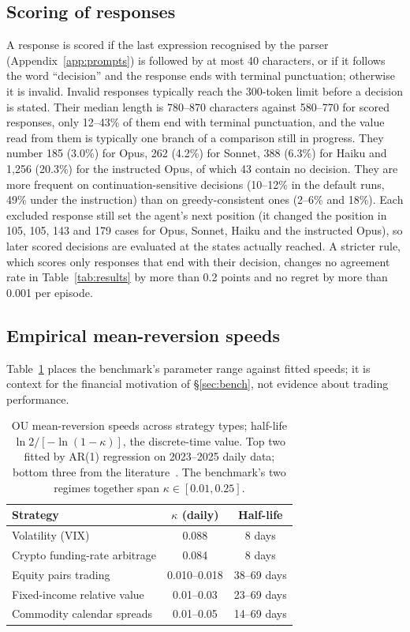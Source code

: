 \documentclass[10pt,a4paper,twocolumn]{article}
\begin{document}
\subsection{Scoring of responses}\label{app:verify-complete}
A response is scored if the last expression recognised by the parser (Appendix~\ref{app:prompts}) is followed by at most 40 characters, or if it follows the word ``decision'' and the response ends with terminal punctuation; otherwise it is invalid. Invalid responses typically reach the 300-token limit before a decision is stated. Their median length is 780--870 characters against 580--770 for scored responses, only 12--43\% of them end with terminal punctuation, and the value read from them is typically one branch of a comparison still in progress. They number 185 (3.0\%) for Opus, 262 (4.2\%) for Sonnet, 388 (6.3\%) for Haiku and 1{,}256 (20.3\%) for the instructed Opus, of which 43 contain no decision. They are more frequent on continuation-sensitive decisions (10--12\% in the default runs, 49\% under the instruction) than on greedy-consistent ones (2--6\% and 18\%). Each excluded response still set the agent's next position (it changed the position in 105, 105, 143 and 179 cases for Opus, Sonnet, Haiku and the instructed Opus), so later scored decisions are evaluated at the states actually reached. A stricter rule, which scores only responses that end with their decision, changes no agreement rate in Table~\ref{tab:results} by more than 0.2 points and no regret by more than 0.001 per episode.

\subsection{Empirical mean-reversion speeds}\label{app:verify-market}
Table~\ref{tab:kappa} places the benchmark's parameter range against fitted speeds; it is context for the financial motivation of \S\ref{sec:bench}, not evidence about trading performance.
\begin{table}[h]
\centering\footnotesize
\begin{tabular}{@{}lcc@{}}
\toprule
Strategy & $\kappa$ (daily) & Half-life \\
\midrule
Volatility (VIX)              & 0.088       & 8 days \\
Crypto funding-rate arbitrage & 0.084       & 8 days \\
Equity pairs trading          & 0.010--0.018 & 38--69 days \\
Fixed-income relative value   & 0.01--0.03  & 23--69 days \\
Commodity calendar spreads    & 0.01--0.05  & 14--69 days \\
\bottomrule
\end{tabular}
\caption{OU mean-reversion speeds across strategy types; half-life $\ln 2/[-\ln(1-\kappa)]$, the discrete-time value. Top two fitted by AR(1) regression on 2023--2025 daily data; bottom three from the literature~\cite{elliott2005,bertram2010,leung2015}. The benchmark's two regimes together span $\kappa\in[0.01,0.25]$.}
\label{tab:kappa}
\end{table}
\end{document}
